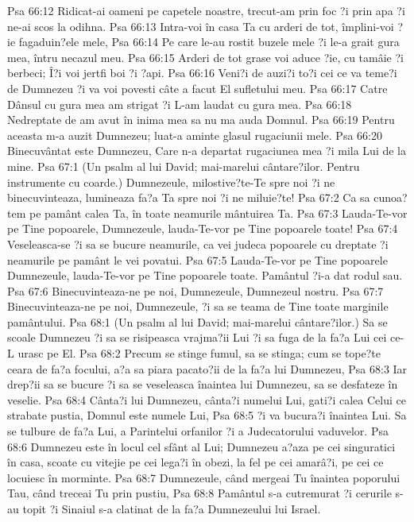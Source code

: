 Psa 66:12  Ridicat-ai oameni pe capetele noastre, trecut-am prin foc ?i prin apa ?i ne-ai scos la odihna.
Psa 66:13  Intra-voi în casa Ta cu arderi de tot, împlini-voi ?ie fagaduin?ele mele,
Psa 66:14  Pe care le-au rostit buzele mele ?i le-a grait gura mea, întru necazul meu.
Psa 66:15  Arderi de tot grase voi aduce ?ie, cu tamâie ?i berbeci; Î?i voi jertfi boi ?i ?api.
Psa 66:16  Veni?i de auzi?i to?i cei ce va teme?i de Dumnezeu ?i va voi povesti câte a facut El sufletului meu.
Psa 66:17  Catre Dânsul cu gura mea am strigat ?i L-am laudat cu gura mea.
Psa 66:18  Nedreptate de am avut în inima mea sa nu ma auda Domnul.
Psa 66:19  Pentru aceasta m-a auzit Dumnezeu; luat-a aminte glasul rugaciunii mele.
Psa 66:20  Binecuvântat este Dumnezeu, Care n-a departat rugaciunea mea ?i mila Lui de la mine.
Psa 67:1  (Un psalm al lui David; mai-marelui cântare?ilor. Pentru instrumente cu coarde.) Dumnezeule, milostive?te-Te spre noi ?i ne binecuvinteaza, lumineaza fa?a Ta spre noi ?i ne miluie?te!
Psa 67:2  Ca sa cunoa?tem pe pamânt calea Ta, în toate neamurile mântuirea Ta.
Psa 67:3  Lauda-Te-vor pe Tine popoarele, Dumnezeule, lauda-Te-vor pe Tine popoarele toate!
Psa 67:4  Veseleasca-se ?i sa se bucure neamurile, ca vei judeca popoarele cu dreptate ?i neamurile pe pamânt le vei povatui.
Psa 67:5  Lauda-Te-vor pe Tine popoarele Dumnezeule, lauda-Te-vor pe Tine popoarele toate. Pamântul ?i-a dat rodul sau.
Psa 67:6  Binecuvinteaza-ne pe noi, Dumnezeule, Dumnezeul nostru.
Psa 67:7  Binecuvinteaza-ne pe noi, Dumnezeule, ?i sa se teama de Tine toate marginile pamântului.
Psa 68:1  (Un psalm al lui David; mai-marelui cântare?ilor.) Sa se scoale Dumnezeu ?i sa se risipeasca vrajma?ii Lui ?i sa fuga de la fa?a Lui cei ce-L urasc pe El.
Psa 68:2  Precum se stinge fumul, sa se stinga; cum se tope?te ceara de fa?a focului, a?a sa piara pacato?ii de la fa?a lui Dumnezeu,
Psa 68:3  Iar drep?ii sa se bucure ?i sa se veseleasca înaintea lui Dumnezeu, sa se desfateze în veselie.
Psa 68:4  Cânta?i lui Dumnezeu, cânta?i numelui Lui, gati?i calea Celui ce strabate pustia, Domnul este numele Lui,
Psa 68:5  ?i va bucura?i înaintea Lui. Sa se tulbure de fa?a Lui, a Parintelui orfanilor ?i a Judecatorului vaduvelor.
Psa 68:6  Dumnezeu este în locul cel sfânt al Lui; Dumnezeu a?aza pe cei singuratici în casa, scoate cu vitejie pe cei lega?i în obezi, la fel pe cei amarâ?i, pe cei ce locuiesc în morminte.
Psa 68:7  Dumnezeule, când mergeai Tu înaintea poporului Tau, când treceai Tu prin pustiu,
Psa 68:8  Pamântul s-a cutremurat ?i cerurile s-au topit ?i Sinaiul s-a clatinat de la fa?a Dumnezeului lui Israel.
